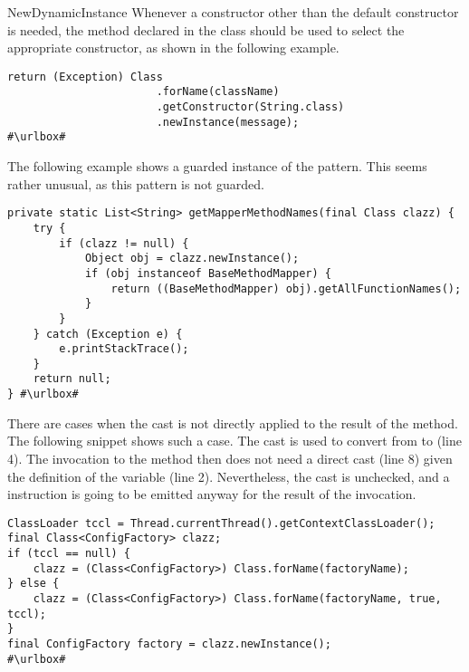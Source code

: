 \begin{pattern}{NewDynamicInstance}
Whenever a constructor other than the default constructor is needed,
the  method declared in the  class
should be used to select the appropriate constructor,
as shown in the following example.%
\def\urlvar{http://bit.ly/gradle_gradle_2HsUgOo}

\begin{verbatim}
return (Exception) Class
                       .forName(className)
                       .getConstructor(String.class)
                       .newInstance(message);
#\urlbox#
\end{verbatim}

The following example%
\def\urlvar{http://bit.ly/alibaba_LuaViewSDK_2HC33xg}
shows a guarded instance of the \thisp{} pattern.
This seems rather unusual, as this pattern is not guarded.

\begin{verbatim}
private static List<String> getMapperMethodNames(final Class clazz) {
    try {
        if (clazz != null) {
            Object obj = clazz.newInstance();
            if (obj instanceof BaseMethodMapper) {
                return ((BaseMethodMapper) obj).getAllFunctionNames();
            }
        }
    } catch (Exception e) {
        e.printStackTrace();
    }
    return null;
} #\urlbox#
\end{verbatim}

There are cases when the cast is not directly applied to the result of the  method.
The following snippet shows such a case.%
\def\urlvar{http://bit.ly/pac4j_pac4j_2HJtXUn}
The cast is used to convert from  to  (line 4).
The invocation to the  method then does not need a direct cast (line 8) given the definition of the  variable (line 2).
Nevertheless, the cast is unchecked, and a  instruction is going to be emitted anyway for the result of the  invocation.

\begin{verbatim}
ClassLoader tccl = Thread.currentThread().getContextClassLoader();
final Class<ConfigFactory> clazz;
if (tccl == null) {
    clazz = (Class<ConfigFactory>) Class.forName(factoryName);
} else {
    clazz = (Class<ConfigFactory>) Class.forName(factoryName, true, tccl);
}
final ConfigFactory factory = clazz.newInstance();
#\urlbox#
\end{verbatim}




\end{pattern}
